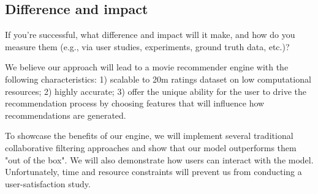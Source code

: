 \subsection{Difference and impact}
If you're successful, what difference and impact will it make, and how do you measure them (e.g., via user studies, experiments, ground truth data, etc.)?

We believe our approach will lead to a movie recommender engine with the following characteristics: 1) scalable to 20m ratings dataset on low computational resources; 2) highly accurate; 3) offer the unique ability for the user to drive the recommendation process by choosing features that will influence how recommendations are generated. 

To showcase the benefits of our engine, we will implement several traditional collaborative filtering approaches and show that our model outperforms them "out of the box". We will also demonstrate how users can interact with the model. Unfortunately, time and resource constraints will prevent us from conducting a user-satisfaction study. 

